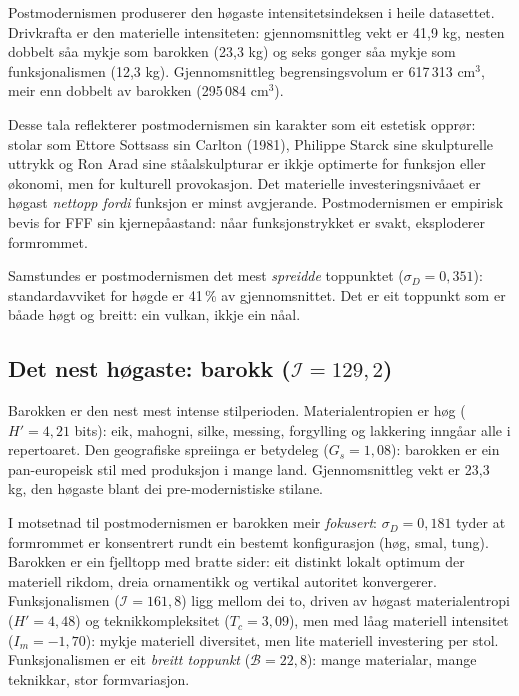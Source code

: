 \documentclass[10pt, a4paper, twocolumn]{article}
\begin{document}
Postmodernismen produserer den h\o gaste intensitetsindeksen i heile datasettet. Drivkrafta er den materielle intensiteten: gjennomsnittleg vekt er 41{,}9 kg, nesten dobbelt s\r{a}a mykje som barokken (23{,}3 kg) og seks gonger s\r{a}a mykje som funksjonalismen (12{,}3 kg). Gjennomsnittleg begrensingsvolum er 617\,313 cm$^3$, meir enn dobbelt av barokken (295\,084 cm$^3$).

Desse tala reflekterer postmodernismen sin karakter som eit estetisk oppr\o r: stolar som Ettore Sottsass sin Carlton (1981), Philippe Starck sine skulpturelle uttrykk og Ron Arad sine st\r{a}alskulpturar er ikkje optimerte for funksjon eller \o konomi, men for kulturell provokasjon. Det materielle investeringsniv\r{a}aet er h\o gast \emph{nettopp fordi} funksjon er minst avgjerande. Postmodernismen er empirisk bevis for FFF sin kjernep\r{a}astand: n\r{a}ar funksjonstrykket er svakt, eksploderer formrommet.

Samstundes er postmodernismen det mest \emph{spreidde} toppunktet ($\sigma_D = 0{,}351$): standardavviket for h\o gde er 41\,\% av gjennomsnittet. Det er eit toppunkt som er b\r{a}ade h\o gt og breitt: ein vulkan, ikkje ein n\r{a}al.


\subsection{Det nest h\o gaste: barokk ($\mathcal{I} = 129{,}2$)}

Barokken er den nest mest intense stilperioden. Materialentropien er h\o g ($H' = 4{,}21$ bits): eik, mahogni, silke, messing, forgylling og lakkering inng\r{a}ar alle i repertoaret. Den geografiske spreiinga er betydeleg ($G_s = 1{,}08$): barokken er ein pan-europeisk stil med produksjon i mange land. Gjennomsnittleg vekt er 23{,}3 kg, den h\o gaste blant dei pre-modernistiske stilane.

I motsetnad til postmodernismen er barokken meir \emph{fokusert}: $\sigma_D = 0{,}181$ tyder at formrommet er konsentrert rundt ein bestemt konfigurasjon (h\o g, smal, tung). Barokken er ein fjelltopp med bratte sider: eit distinkt lokalt optimum der materiell rikdom, dreia ornamentikk og vertikal autoritet konvergerer. Funksjonalismen ($\mathcal{I} = 161{,}8$) ligg mellom dei to, driven av h\o gast materialentropi ($H' = 4{,}48$) og teknikkompleksitet ($T_c = 3{,}09$), men med l\r{a}ag materiell intensitet ($I_m = -1{,}70$): mykje materiell diversitet, men lite materiell investering per stol. Funksjonalismen er eit \emph{breitt toppunkt} ($\mathcal{B} = 22{,}8$): mange materialar, mange teknikkar, stor formvariasjon.
\end{document}
